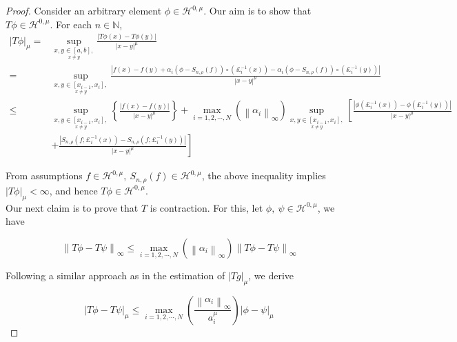 \documentclass{article}[12pt, a4]
\begin{document}
	\begin{proof}
		
		Consider an arbitrary element $\phi \in \mathcal{H}^{0,\mu}$. Our aim is to show that $T\phi \in \mathcal{H}^{0,\mu} $. For each $n \in \mathbb{N}$,
		\begin{align*}
			|T \phi|_{\mu}= & \sup _{\underset{x \neq y}{x, y \in [a,b],}} \frac{|T \phi(x)-T \phi(y)|}{|x-y|^{\mu}} \\
			= & \sup _{\underset{x \neq y}{x, y \in [x_{i-1},x_i], }} \frac{\left|f(x)-f(y)+\alpha_{i}\left(\phi-S_{n,\rho}(f)\right) \circ\left(\pounds_{i}^{-1}(x)\right)-\alpha_{i}\left(\phi-S_{n,\rho}(f)\right) \circ\left(\pounds_{i}^{-1}(y)\right)\right|}{|x-y|^{\mu}} \\
			\leq & \sup _{\underset{x \neq y}{x, y \in [x_{i-1},x_i], }}\left\{\frac{|f(x)-f(y)|}{|x-y|^{\mu}}\right\}+\max _{i =1,2,\cdots,N}\left(\left\|\alpha_{i}\right\|_{\infty}\right) \sup _{\underset{x \neq y}{x, y \in [x_{i-1},x_i], }}\left[\frac{\left|\phi\left(\pounds_{i}^{-1}(x)\right)-\phi\left(\pounds_{i}^{-1}(y)\right)\right|}{|x-y|^{\mu}}\right. \\
			& \left.+\frac{\left|S_{n,\rho}\left(f ; \pounds_{i}^{-1}(x)\right)-S_{n,\rho}\left(f ; \pounds_{i}^{-1}(y)\right)\right|}{|x-y|^{\mu}}\right]
		\end{align*}
		
		
		From assumptions $f \in \mathcal{H}^{0,\mu},~ S_{n,\rho}(f) \in \mathcal{H}^{0,\mu}$, the above inequality implies $|T \phi|_{\mu}<\infty$, and hence $T \phi \in \mathcal{H}^{0,\mu}$.\\
		Our next claim is to prove that $T$ is contraction. For this, let $\phi,~ \psi \in \mathcal{H}^{0,\mu}$, we have
		
		\begin{equation}\label{10}
			\left\|T\phi - T\psi\right\|_{\infty} \leq \max _{i =1,2,\cdots,N}\left(\left\|\alpha_{i}\right\|_{\infty}\right)\left\|T\phi - T\psi\right\|_{\infty}
		\end{equation}
		
		
		Following a similar approach as in the estimation of $|T g|_{\mu}$, we derive
		
		\begin{equation}\label{11}
			\left|T\phi - T\psi\right|_{\mu} \leq \max _{i =1,2,\cdots,N}\left(\frac{\left\|\alpha_{i}\right\|_{\infty}}{a_{i}^{\mu}}\right)\left|\phi - \psi\right|_{\mu}
		\end{equation}
		

\end{proof}
\end{document}
